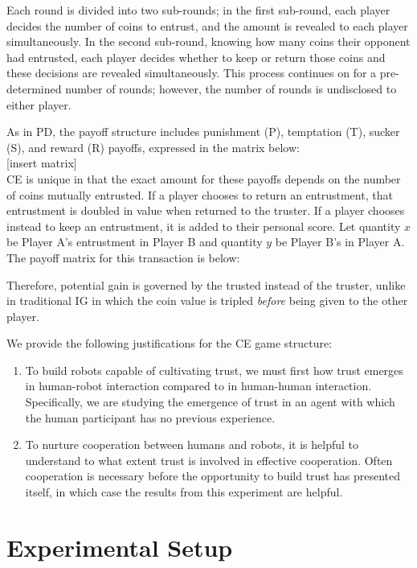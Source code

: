 \documentclass{sig-alternate}
\begin{document}
Each round is divided into two sub-rounds; in the first sub-round, each player decides the number of coins to entrust, and the amount is revealed to each player simultaneously. In the second sub-round, knowing how many coins their opponent had entrusted, each player decides whether to keep or return those coins and these decisions are revealed simultaneously. This process continues on for a pre-determined number of rounds; however, the number of rounds is undisclosed to either player. 

As in PD, the payoff structure includes punishment (P), temptation (T), sucker (S), and reward (R) payoffs, expressed in the matrix below: \\

[insert matrix]\\

CE is unique in that the exact amount for these payoffs depends on the number of coins mutually entrusted. If a player chooses to return an entrustment, that entrustment is doubled in value when returned to the truster. If a player chooses instead to keep an entrustment, it is added to their personal score. Let quantity $x$ be Player A's entrustment in Player B and quantity $y$ be Player B's in Player A. The payoff matrix for this transaction is below:

Therefore, potential gain is governed by the trusted instead of the truster, unlike in traditional IG in which the coin value is tripled \textit{before} being given to the other player. 

We provide the following justifications for the CE game structure:

\begin{enumerate}
\item To build robots capable of cultivating trust, we must first how trust emerges in human-robot interaction compared to in human-human interaction. Specifically, we are studying the emergence of trust in an agent with which the human participant has no previous experience.
\item To nurture cooperation between humans and robots, it is helpful to understand to what extent trust is involved in effective cooperation. Often cooperation is necessary before the opportunity to build trust has presented itself, in which case the results from this experiment are helpful.
\end{enumerate}


\section{Experimental Setup}
\end{document}
